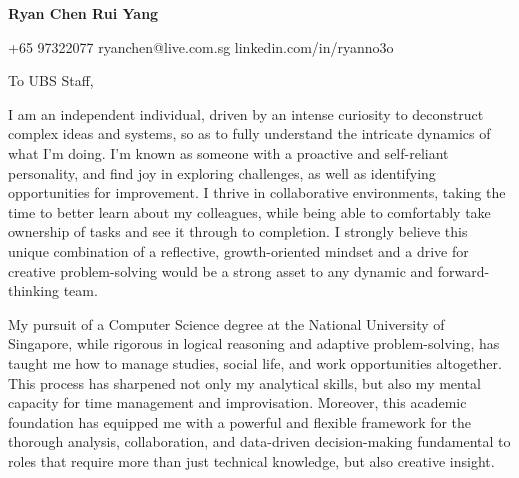 \documentclass[11pt, a4paper]{article}
\begin{document}
\begin{center}
    \Large\bfseries Ryan Chen Rui Yang\\
\end{center}

\vspace{1mm}

\begin{center}
    +65 97322077 \textbullet{} ryanchen@live.com.sg \textbullet{} linkedin.com/in/ryanno3o
\end{center}

\noindent
To UBS Staff,

\vspace{2mm}

\noindent
I am an independent individual, driven by an intense curiosity to deconstruct complex ideas and systems, so as to fully understand the intricate dynamics of what I'm doing. I'm known as someone with a proactive and self-reliant personality, and find joy in exploring challenges, as well as identifying opportunities for improvement. I thrive in collaborative environments, taking the time to better learn about my colleagues, while being able to comfortably take ownership of tasks and see it through to completion. I strongly believe this unique combination of a reflective, growth-oriented mindset and a drive for creative problem-solving would be a strong asset to any dynamic and forward-thinking team.

\vspace{2mm}

\noindent
My pursuit of a Computer Science degree at the National University of Singapore, while rigorous in logical reasoning and adaptive problem-solving, has taught me how to manage studies, social life, and work opportunities altogether. This process has sharpened not only my analytical skills, but also my mental capacity for time management and improvisation. Moreover, this academic foundation has equipped me with a powerful and flexible framework for the thorough analysis, collaboration, and data-driven decision-making fundamental to roles that require more than just technical knowledge, but also creative insight.

\vspace{2mm}
\end{document}
